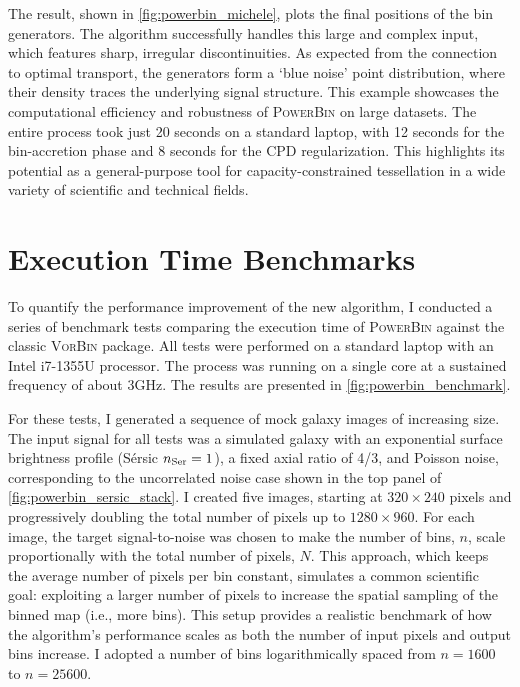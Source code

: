 \documentclass[fleqn,usenatbib]{mnras}
\begin{document}
The result, shown in \autoref{fig:powerbin_michele}, plots the final positions of the bin generators. The algorithm successfully handles this large and complex input, which features sharp, irregular discontinuities. As expected from the connection to optimal transport, the generators form a `blue noise' point distribution, where their density traces the underlying signal structure. This example showcases the computational efficiency and robustness of \textsc{PowerBin} on large datasets. The entire process took just 20 seconds on a standard laptop, with 12 seconds for the bin-accretion phase and 8 seconds for the CPD regularization. This highlights its potential as a general-purpose tool for capacity-constrained tessellation in a wide variety of scientific and technical fields.

\section{Execution Time Benchmarks}
\label{sec:benchmark}

To quantify the performance improvement of the new algorithm, I conducted a series of benchmark tests comparing the execution time of \textsc{PowerBin} against the classic \textsc{VorBin} package. All tests were performed on a standard laptop with an Intel i7-1355U processor. The process was running on a single core at a sustained frequency of about 3GHz. The results are presented in \autoref{fig:powerbin_benchmark}.

For these tests, I generated a sequence of mock galaxy images of increasing size. The input signal for all tests was a simulated galaxy with an exponential surface brightness profile (Sérsic $n_{\rm Ser}=1$), a fixed axial ratio of 4/3, and Poisson noise, corresponding to the uncorrelated noise case shown in the top panel of \autoref{fig:powerbin_sersic_stack}. I created five images, starting at $320\times240$ pixels and progressively doubling the total number of pixels up to $1280\times960$. For each image, the target signal-to-noise was chosen to make the number of bins, $n$, scale proportionally with the total number of pixels, $N$. This approach, which keeps the average number of pixels per bin constant, simulates a common scientific goal: exploiting a larger number of pixels to increase the spatial sampling of the binned map (i.e., more bins). This setup provides a realistic benchmark of how the algorithm's performance scales as both the number of input pixels and output bins increase. I adopted a number of bins logarithmically spaced from $n=1600$ to $n=25600$.
\end{document}
